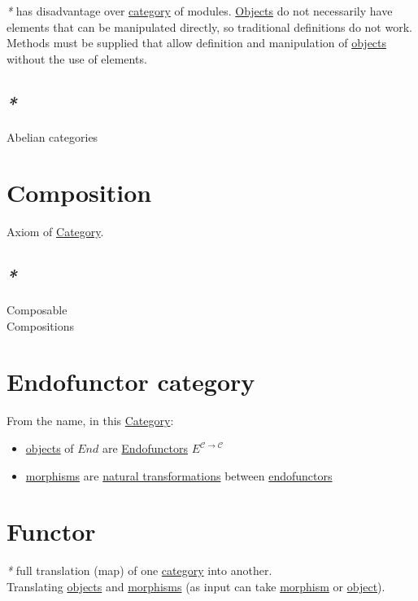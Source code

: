\documentclass[a4paper,14pt,oneside]{book}
\begin{document}
\emph{*} has disadvantage over \hyperref[org74d6ac5]{category} of modules. \hyperref[orgc973d87]{Objects} do not necessarily have elements that can be manipulated directly, so traditional definitions do not work. Methods must be supplied that allow definition and manipulation of \hyperref[orgc973d87]{objects} without the use of elements.\\

\subsection{\emph{*}}
\label{sec:org1b14556}

\label{orgc9c3397}Abelian categories\\

\section{\label{orgde6ed92}Composition}
\label{sec:orgad64d7f}
Axiom of \hyperref[org74d6ac5]{Category}.\\

\subsection{\emph{*}}
\label{sec:org3bd37ab}

\label{org7b9fb42}Composable\\
\label{org66b8de8}Compositions\\

\section{\label{org8f8718c}Endofunctor category}
\label{sec:org39aea26}
From the name, in this \hyperref[org74d6ac5]{Category}:\\
\begin{itemize}
\item \hyperref[orgc973d87]{objects} of \(End\) are \hyperref[org37f6cda]{Endofunctors} \(E^{\mathcal{C \to C}}\)\\
\item \hyperref[org801ca09]{morphisms} are \hyperref[org6308cc7]{natural transformations} between \hyperref[org37f6cda]{endofunctors}\\
\end{itemize}

\section{\label{org4ae20fc}Functor}
\label{sec:orgdb44c6e}
\emph{*} full translation (map) of one \hyperref[org74d6ac5]{category} into another.\\
Translating \hyperref[orgc973d87]{objects} and \hyperref[org801ca09]{morphisms} (as input can take \hyperref[orga7d420f]{morphism} or \hyperref[org920c789]{object}).\\
\end{document}
